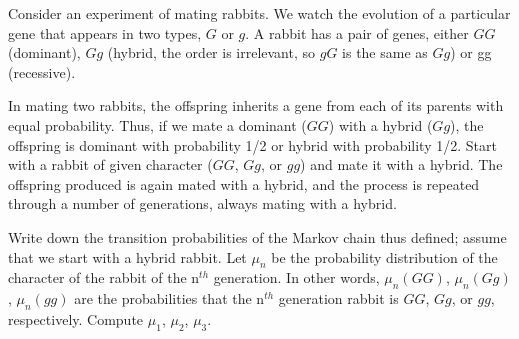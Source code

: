 \begin{question}
Consider an experiment of mating rabbits. We watch the evolution of a particular gene that appears in two types, $G$ or $g$. A rabbit has a pair of genes, either $GG$ (dominant), $Gg$ (hybrid, the order is irrelevant, so $gG$ is the same as $Gg$) or gg (recessive).

In mating two rabbits, the offspring inherits a gene from each of its parents with equal probability. Thus, if we mate a dominant ($GG$) with a hybrid ($Gg$), the offspring is dominant with probability 1/2 or hybrid with probability 1/2.
Start with a rabbit of given character ($GG$, $Gg$, or $gg$) and mate it with a hybrid. The offspring produced is again mated with a hybrid, and the process is repeated through a number of generations, always mating with a hybrid.
\begin{tasks}
\task Write down the transition probabilities of the Markov chain thus defined;
\task assume that we start with a hybrid rabbit. Let $\mu_n$ be the probability distribution of the character of the rabbit of the n$^{th}$ generation. In other words, $\mu_n(GG)$, $\mu_n(Gg)$, $\mu_n(gg)$ are the probabilities that the n$^{th}$ generation rabbit is $GG$, $Gg$, or $gg$, respectively. Compute $\mu_1$, $\mu_2$, $\mu_3$.
\end{tasks}
\end{question}

